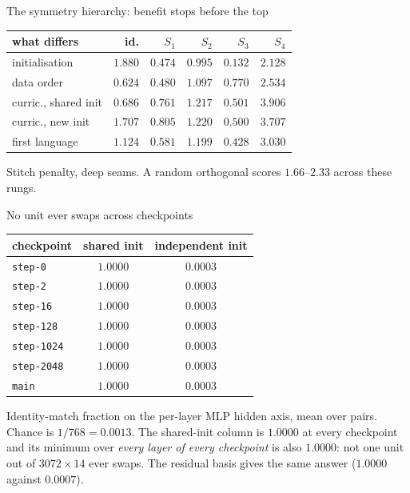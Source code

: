 \documentclass{beamer}
\begin{document}
\begin{frame}{The symmetry hierarchy: benefit stops before the top}
  \centering
  \small
  \small
\begin{tabular}{lrrrrr}
\toprule
what differs & id. & $S_1$ & $S_2$ & $S_3$ & $S_4$ \\
\midrule
initialisation        & $1.880$ & $0.474$ & $0.995$ & $\mathbf{0.132}$ & $2.128$ \\
data order            & $0.624$ & $\mathbf{0.480}$ & $1.097$ & $0.770$ & $2.534$ \\
curric., shared init  & $0.686$ & $0.761$ & $1.217$ & $\mathbf{0.501}$ & $3.906$ \\
curric., new init     & $1.707$ & $0.805$ & $1.220$ & $\mathbf{0.500}$ & $3.707$ \\
first language        & $1.124$ & $0.581$ & $1.199$ & $\mathbf{0.428}$ & $3.030$ \\
\bottomrule
\end{tabular}
  \vspace{0.8em}
  \begin{minipage}{0.92\textwidth}\footnotesize Stitch penalty, deep seams. A random orthogonal scores $1.66$--$2.33$ across these rungs.\end{minipage}
\end{frame}

\begin{frame}{No unit ever swaps across checkpoints}
  \centering
  \small
  \small
\begin{tabular}{lcc}
\toprule
checkpoint & shared init & independent init \\
\midrule
\texttt{step-0}    & $1.0000$ & $0.0003$ \\
\texttt{step-2}    & $1.0000$ & $0.0003$ \\
\texttt{step-16}   & $1.0000$ & $0.0003$ \\
\texttt{step-128}  & $1.0000$ & $0.0003$ \\
\texttt{step-1024} & $1.0000$ & $0.0003$ \\
\texttt{step-2048} & $1.0000$ & $0.0003$ \\
\texttt{main}      & $\mathbf{1.0000}$ & $\mathbf{0.0003}$ \\
\bottomrule
\end{tabular}
  \vspace{0.8em}
  \begin{minipage}{0.92\textwidth}\footnotesize Identity-match fraction on the per-layer MLP hidden axis, mean over pairs. Chance is
$1/768 = 0.0013$. The shared-init column is $1.0000$ at every checkpoint and its minimum over
\emph{every layer of every checkpoint} is also $1.0000$: not one unit out of $3072 \times 14$ ever
swaps. The residual basis gives the same answer ($1.0000$ against $0.0007$).\end{minipage}
\end{frame}
\end{document}
